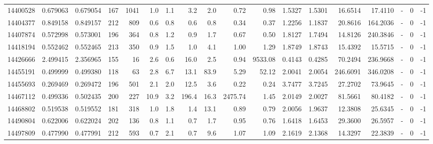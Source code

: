 \begin{tabular}{rrrrrrrrrrrrrrrlrr}
  14400528 & 0.679063 &   0.679054 &  167 & 1041 &      1.0 &      1.1 &     3.2 &      2.0 &       0.72 &        0.98 &  1.5327 &  1.5301 &   16.6514 &   17.4110 &             - &        0 &         -1 \\
  14404377 & 0.849158 &   0.849157 &  212 &  809 &      0.6 &      0.8 &     0.6 &      0.8 &       0.34 &        0.37 &  1.2256 &  1.1837 &   20.8616 &  164.2036 &             - &        0 &         -1 \\
  14407874 & 0.572998 &   0.573001 &  196 &  364 &      0.8 &      1.2 &     0.9 &      1.7 &       0.67 &        0.50 &  1.8127 &  1.7494 &   14.8126 &  240.3846 &             - &        0 &         -1 \\
  14418194 & 0.552462 &   0.552465 &  213 &  350 &      0.9 &      1.5 &     1.0 &      4.1 &       1.00 &        1.29 &  1.8749 &  1.8743 &   15.4392 &   15.5715 &             - &        0 &         -1 \\
  14426666 & 2.499415 &   2.356965 &  155 &   16 &      2.6 &      0.6 &    16.0 &      2.5 &       0.94 &     9533.08 &  0.4143 &  0.4285 &   70.2494 &  236.9668 &             - &        0 &         -1 \\
  14455191 & 0.499999 &   0.499380 &  118 &   63 &      2.8 &      6.7 &    13.1 &     83.9 &       5.29 &       52.12 &  2.0041 &  2.0054 &  246.6091 &  346.0208 &             - &        0 &         -1 \\
  14455693 & 0.269469 &   0.269472 &  196 &  501 &      2.1 &      2.0 &    12.5 &      3.6 &       0.22 &        0.24 &  3.7477 &  3.7245 &   27.2702 &   73.9645 &             - &        0 &         -1 \\
  14467112 & 0.499336 &   0.502435 &  200 &  227 &     10.9 &      3.2 &   196.4 &     16.3 &    2475.74 &        1.45 &  2.0149 &  2.0027 &   81.5661 &   80.4182 &             - &        0 &         -1 \\
  14468802 & 0.519538 &   0.519552 &  181 &  318 &      1.0 &      1.8 &     1.4 &     13.1 &       0.89 &        0.79 &  2.0056 &  1.9637 &   12.3808 &   25.6345 &             - &        0 &         -1 \\
  14490804 & 0.622006 &   0.622024 &  202 &  136 &      0.8 &      1.1 &     0.7 &      1.7 &       0.95 &        0.76 &  1.6418 &  1.6453 &   29.3600 &   26.5957 &             - &        0 &         -1 \\
  14497809 & 0.477990 &   0.477991 &  212 &  593 &      0.7 &      2.1 &     0.7 &      9.6 &       1.07 &        1.09 &  2.1619 &  2.1368 &   14.3297 &   22.3839 &             - &        0 &         -1 \\

\end{tabular}
